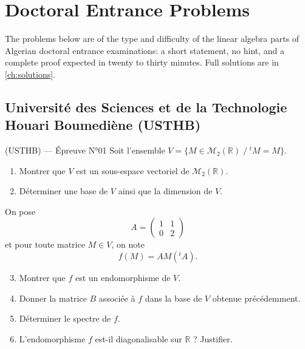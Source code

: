 \chapter{Doctoral Entrance Problems}
\label{ch:problems}

The problems below are of the type and difficulty of the linear algebra parts of
Algerian doctoral entrance examinations: a short statement, no hint, and a
complete proof expected in twenty to thirty minutes. Full solutions are in
\cref{ch:solutions}.
\newpage

\section{Université des Sciences et de la Technologie Houari Boumediène (USTHB)}

\begin{problem}{(USTHB) — Épreuve N°01}{}
Soit l'ensemble $V = \{M \in \mathcal{M}_2(\mathbb{R}) \;/\; {}^tM = M\}$.
\begin{enumerate}
\item Montrer que $V$ est un sous-espace vectoriel de $\mathcal{M}_2(\mathbb{R})$.

\item Déterminer une base de $V$ ainsi que la dimension de $V$.

\end{enumerate}

On pose
$$
A=\begin{pmatrix}
1 & 1\\
0 & 2
\end{pmatrix}
$$
et pour toute matrice $M\in V$, on note
$$
f(M)=AM({}^tA).
$$

\begin{enumerate}
\setcounter{enumi}{2}

\item Montrer que $f$ est un endomorphisme de $V$.

\item Donner la matrice $B$ associée à $f$ dans la base de $V$ obtenue précédemment.

\item Déterminer le spectre de $f$.

\item L'endomorphisme $f$ est-il diagonalisable sur $\mathbb{R}$ ? Justifier.

\end{enumerate}

\end{problem}

